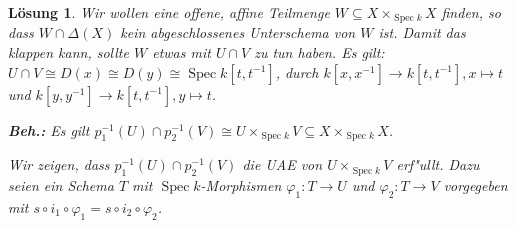 \documentclass[paper = A4, fontsize=12pt, numbers=noendperiod, chapterprefix=true]{scrbook}
\theoremstyle{break}
\newtheorem{Loes}{L\"osung}
\theoremstyle{nonumberbreak}
\theoremstyle{nonumberplain}
\DeclareMathOperator{\Spec}{Spec}
\DeclareMathOperator{\id}{id}
\begin{document}
\begin{Loes}
Wir wollen eine offene, affine Teilmenge $W \subseteq X \times_{\Spec k} X$ finden, so dass $W \cap \Delta(X)$ kein abgeschlossenes Unterschema von $W$ ist. Damit das klappen kann, sollte $W$ etwas mit $U \cap V$ zu tun haben.
Es gilt: $U \cap V \cong D(x) \cong D(y) \cong \Spec k[t, t^{-1}]$, durch $k[x,x^{-1}] \to k[t,t^{-1}], x \mapsto t$ und $k[y,y^{-1}] \to k[t,t^{-1}], y \mapsto t$.

\begin{minipage}{5cm}
\end{minipage}
\textbf{Beh.:} Es gilt $p_1^{-1}(U) \cap p_2^{-1}(V) \cong U \times_{\Spec k} V \subseteq X \times_{\Spec k} X$.

Wir zeigen, dass $p_1^{-1}(U) \cap p_2^{-1}(V)$ die UAE von $U \times_{\Spec k} V$ erf"ullt. Dazu seien ein Schema $T$ mit $\Spec k$-Morphismen $\varphi_1 \colon T \to U$ und $\varphi_2 \colon T \to V$ vorgegeben mit $s \circ i_1 \circ \varphi_1 = s \circ i_2 \circ \varphi_2$.


\end{Loes}
\end{document}
